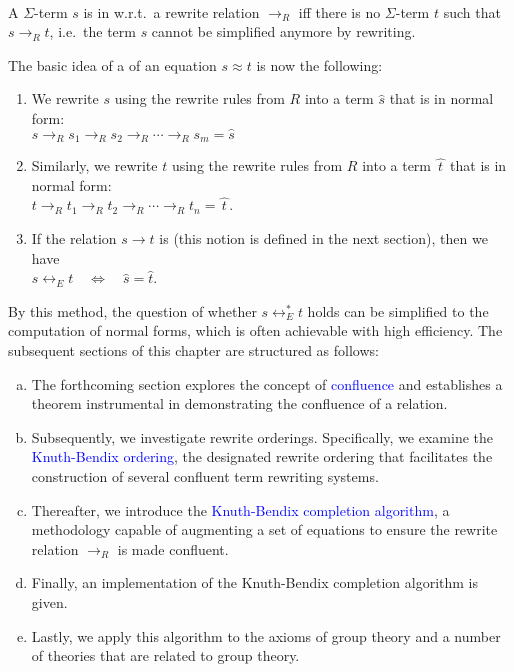 \begin{Definition} \hspace*{\fill} \\
  A $\Sigma$-term $s$ is in  w.r.t.~a rewrite relation $\rightarrow_R$ iff there is no
  $\Sigma$-term $t$ such that $s \rightarrow_R t$, i.e.~the term $s$ cannot be simplified anymore by rewriting. \eod
\end{Definition}
The basic idea of a  of an equation $s \approx t$ is now the following:
\begin{enumerate}
\item We rewrite $s$ using the rewrite rules from $R$ into a term $\widehat{s}$ that is in normal form:
      \\[0.2cm]
      \hspace*{1.3cm}
      $s \rightarrow_R s_1 \rightarrow_R s_2 \rightarrow_R \cdots \rightarrow_R s_m = \widehat{s}$
\item Similarly, we rewrite $t$ using the rewrite rules from $R$ into a term $\widehat{\,t\,}$ that is in normal form:
      \\[0.2cm]
      \hspace*{1.3cm}
      $t \rightarrow_R t_1 \rightarrow_R t_2 \rightarrow_R \cdots \rightarrow_R t_n = \widehat{\,t\,}$.
\item If the relation $s \rightarrow t$ is  (this notion is defined in the next section),
      then we have 
      \\[0.2cm]
      \hspace*{1.3cm}
      $s \leftrightarrow_E t \quad \Leftrightarrow \quad \widehat{s} = \widehat{t}$.
    \end{enumerate}
By this method, the question of whether $s \leftrightarrow_E^* t$ holds can be simplified to the computation of
normal forms, which is often achievable with high efficiency. The subsequent sections of this chapter are
structured as follows: 
\begin{enumerate}[(a)]
\item The forthcoming section explores the concept of \textcolor{blue}{confluence} and establishes a theorem
      instrumental in demonstrating the confluence of a relation. 
\item Subsequently, we investigate rewrite orderings. Specifically, we examine the
      \textcolor{blue}{Knuth-Bendix ordering}, the designated rewrite ordering that facilitates the construction of
      several confluent term rewriting systems. 
\item Thereafter, we introduce the \textcolor{blue}{Knuth-Bendix completion algorithm}, a methodology capable
      of augmenting a set of equations to ensure the rewrite relation $\rightarrow_R$ is made confluent. 
\item Finally, an implementation of the Knuth-Bendix completion algorithm is given.
\item Lastly, we apply this algorithm to the axioms of group theory and a number of theories that are related
      to group theory.
\end{enumerate}


